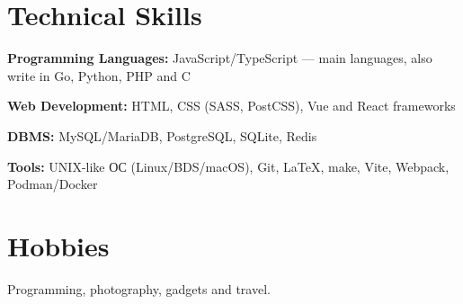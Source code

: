 \documentclass[10pt]{article}
\begin{document}

\section{Technical Skills}

\begin{compactitemize}
	\item \textbf{Programming Languages:} JavaScript/TypeScript --- main languages, also write in Go, Python, PHP and C
	\item \textbf{Web Development:} HTML, CSS (SASS, PostCSS), Vue and React frameworks
	\item \textbf{DBMS:} MySQL/MariaDB, PostgreSQL, SQLite, Redis
	\item \textbf{Tools:} UNIX-like ОС (Linux/BDS/macOS), Git, \LaTeX, make, Vite, Webpack, Podman/Docker
\end{compactitemize}


\section{Hobbies}

Programming, photography, gadgets and travel.





\end{document}
